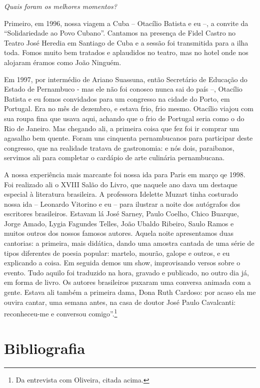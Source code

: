 \bigskip

\textit{Quais foram os melhores momentos?}\bigskip

Primeiro, em 1996, nossa viagem a Cuba -- Otacílio
Batista e eu --, a convite da ``Solidariedade ao Povo
Cubano''. Cantamos na presença de Fidel Castro no Teatro
José Heredia em Santiago de Cuba e a sessão foi transmitida
para a ilha toda. Fomos muito bem tratados e aplaudidos no
teatro, mas no hotel onde nos alojaram éramos como João
Ninguém.

Em 1997, por intermédio de Ariano Suassuna, então
Secretário de Educação do Estado de Pernambuco - mas
ele não foi conosco nunca sai do país --, Otacílio Batista e
eu fomos convidados para um congresso na cidade do Porto,
em Portugal. Era no mês de dezembro, e estava frio, frio
mesmo. Otacílio viajou com sua roupa fina que usava aqui,
achando que o frio de Portugal seria como o do Rio de
Janeiro. Mas chegando ali, a primeira coisa que fez foi ir
comprar um agasalho bem quente. Foram uns cinquenta
pernambucanos para participar deste congresso, que na
realidade tratava de gastronomia: e nós dois, paraibanos,
servimos ali para completar o cardápio de arte culinária
pernambucana.

A nossa experiência mais marcante foi nossa ida para
Paris em março qe 1998. Foi realizado ali o XVIII Salão
do Livro, que naquele ano dava um destaque especial à
literatura brasileira. A professora Idelette Muzart tinha
costurado nossa ida -- Leonardo Vitorino e eu -- para
ilustrar a noite dos autógrafos dos escritores brasileiros.
Estavam lá José Sarney, Paulo Coelho, Chico Buarque,
Jorge Amado, Lygia Fagundes Telles, João Ubaldo
Ribeiro, Saulo Ramos e muitos outros dos nossos famosos
autores. Aquela noite apresentamos duas cantorias: a
primeira, mais didática, dando uma amostra cantada de
uma série de tipos diferentes de poesia popular: martelo,
mourão, galope e outros, e eu explicando a coisa. Em
seguida demos um show, improvisando versos sobre o
evento. Tudo aquilo foi traduzido na hora, gravado e
publicado, no outro dia já, em forma de livro. Os autores
brasileiros puxaram uma conversa animada com a gente.
Estava ali também a primeira dama, Dona Ruth Cardoso:
por acaso ela me ouvira cantar, uma semana antes, na casa
de doutor José Paulo Cavalcanti: reconheceu-me e
conversou comigo''.\footnote{ Da entrevista com Oliveira,
citada acima.}

%
%
%

\section{Bibliografia}

